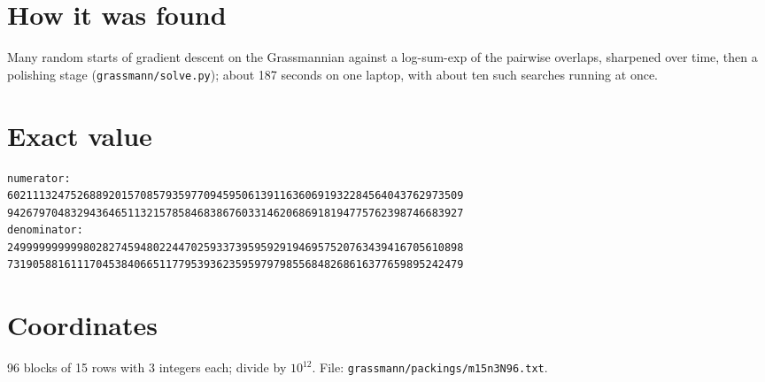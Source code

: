 \documentclass[11pt,a4paper]{article}
\begin{document}
\section{How it was found}
Many random starts of gradient descent on the Grassmannian against a log-sum-exp of the pairwise overlaps, sharpened over time, then a polishing stage (\texttt{grassmann/solve.py}); about 187 seconds on one laptop, with about ten such searches running at once.


\appendix
\section{Exact value}
{\small
\begin{verbatim}
numerator:
602111324752688920157085793597709459506139116360691932284564043762973509
942679704832943646511321578584683867603314620686918194775762398746683927
denominator:
249999999999802827459480224470259337395959291946957520763439416705610898
731905881611170453840665117795393623595979798556848268616377659895242479
\end{verbatim}}

\section{Coordinates}
96 blocks of 15 rows with 3 integers each; divide by $10^{12}$. File: \texttt{grassmann/packings/m15n3N96.txt}.
{\tiny
\begin{multicols}{3}
\end{multicols}}
\end{document}
